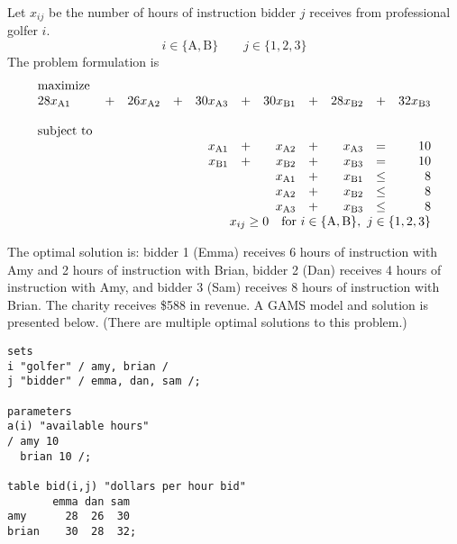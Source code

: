 \begin{enumerate}
\begin{solution}
\begin{center}
\end{center}

Let $x_{ij}$ be the number of hours of instruction bidder $j$ receives
from professional golfer $i$.
  \[
     i \in \{\text{A},\text{B}\} \qquad j \in \{1,2,3\}
  \]
  The problem formulation is
\[
  \begin{array}{lrrrrrrrrrr}
    \textrm{maximize} &&&&&&&&&&\\   
    28x_{\text{A}1}&+& 26x_{\text{A}2}&+&30x_{\text{A}3}&+&30x_{\text{B}1}&+&28x_{\text{B}2}&+&32x_{\text{B}3} \\ \\
    \textrm{subject to}  &&&&&&&&&&\\
    & & & & x_{\text{A}1}&+ & x_{\text{A}2}&+ &x_{\text{A}3} & = & 10 \\
    & & & & x_{\text{B}1}&+ & x_{\text{B}2}&+ &x_{\text{B}3} & = & 10 \\
    & & & & & &  x_{\text{A}1} & + & x_{\text{B}1} & \leq & 8 \\
    & & & & & &  x_{\text{A}2} & + & x_{\text{B}2} & \leq & 8 \\
    & & & & & &  x_{\text{A}3} & + & x_{\text{B}3} & \leq & 8 \\
    \multicolumn{11}{r}{x_{ij} \geq 0 \quad \text{for}~i \in \{\text{A},\text{B}\},~j \in \{1,2,3\} }
  \end{array}
\]

The optimal solution is: bidder 1 (Emma) receives 6 hours of instruction with Amy and
2 hours of instruction with Brian, 
bidder 2 (Dan) receives 4 hours of instruction with Amy, 
and bidder 3 (Sam) receives 8 hours of instruction with Brian. The charity
receives \$588 in revenue. A GAMS model and solution is presented below. 
(There are multiple optimal solutions to this problem.)
\begin{Verbatim}
sets
i "golfer" / amy, brian /
j "bidder" / emma, dan, sam /;

parameters
a(i) "available hours"
/ amy 10
  brian 10 /;
  
table bid(i,j) "dollars per hour bid"
       emma dan sam
amy      28  26  30
brian    30  28  32;


\end{Verbatim}
\end{solution}
\end{enumerate}
